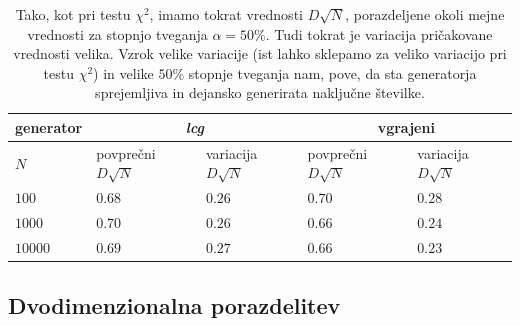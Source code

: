 \documentclass[slovene,11pt,a4paper]{article}
\numberwithin{equation}{section} %
\numberwithin{figure}{section} %
\numberwithin{table}{section} %
\begin{document}
\begin{table}[!h]
\begin{center}
\begin{tabular}{|l|l|l|l|l|}
\hline
generator & \multicolumn{2}{c|}{\textit{lcg}} &  \multicolumn{2}{c|}{vgrajeni}  \\ \hline
$N$ & povprečni $D\sqrt{N}$ & variacija $D\sqrt{N}$ & povprečni $D\sqrt{N}$ & variacija $D\sqrt{N}$ \\  \hline
$100$ & $0.68$ & $0.26$ & $0.70$ & $0.28$ \\ \hline
$1000$ & $0.70$ & $0.26$ & $0.66$ & $0.24$ \\ \hline
$10000$ & $0.69$ & $0.27$ & $0.66$ & $0.23$ \\ \hline
\end{tabular}
\end{center}
\caption{Tako, kot pri testu $\chi^2$, imamo tokrat vrednosti $D\sqrt{N}$, porazdeljene okoli mejne vrednosti  za stopnjo tveganja $\alpha=50\%$. Tudi tokrat je variacija pričakovane vrednosti velika. Vzrok velike variacije (ist lahko sklepamo za veliko variacijo pri testu $\chi^2$) in velike $50\%$ stopnje tveganja nam, pove, da sta generatorja sprejemljiva in dejansko generirata naključne številke. }
\end{table}

\pagebreak

\subsection{Dvodimenzionalna porazdelitev}
\end{document}
